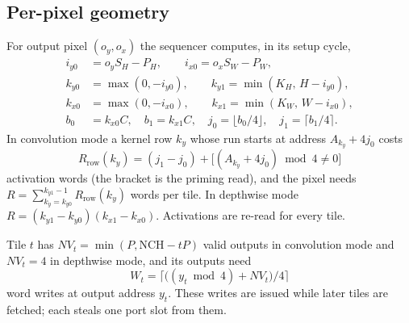 \documentclass[journal]{IEEEtran}
\begin{document}
\subsection{Per-pixel geometry}
For output pixel $(o_y,o_x)$ the sequencer computes, in its setup cycle,
\begin{align}
i_{y0} &= o_y S_H - P_H,\qquad i_{x0} = o_x S_W - P_W,\nonumber\\
k_{y0} &= \max(0,-i_{y0}),\qquad k_{y1}=\min(K_H,\, H-i_{y0}),\nonumber\\
k_{x0} &= \max(0,-i_{x0}),\qquad k_{x1}=\min(K_W,\, W-i_{x0}),\nonumber\\
b_0 &= k_{x0}C,\quad b_1 = k_{x1}C,\quad j_0 = \lfloor b_0/4\rfloor,\quad j_1=\lceil b_1/4\rceil.\label{eq:geom}
\end{align}
In convolution mode a kernel row $k_y$ whose run starts at address $A_{k_y}+4j_0$ costs
\begin{equation}
R_{\mathrm{row}}(k_y) = (j_1 - j_0) + \bigl[(A_{k_y}+4j_0) \bmod 4 \ne 0\bigr]\label{eq:rrow}
\end{equation}
activation words (the bracket is the priming read), and the pixel needs $R = \sum_{k_y=k_{y0}}^{k_{y1}-1} R_{\mathrm{row}}(k_y)$ words per tile. In depthwise mode $R = (k_{y1}-k_{y0})(k_{x1}-k_{x0})$. Activations are re-read for every tile.

Tile $t$ has $NV_t = \min(P, \mathrm{NCH}-tP)$ valid outputs in convolution mode and $NV_t=4$ in depthwise mode, and its outputs need
\begin{equation}
W_t = \bigl\lceil \bigl((y_t \bmod 4) + NV_t\bigr)/4\bigr\rceil\label{eq:wt}
\end{equation}
word writes at output address $y_t$. These writes are issued while later tiles are fetched; each steals one port slot from them.
\end{document}
